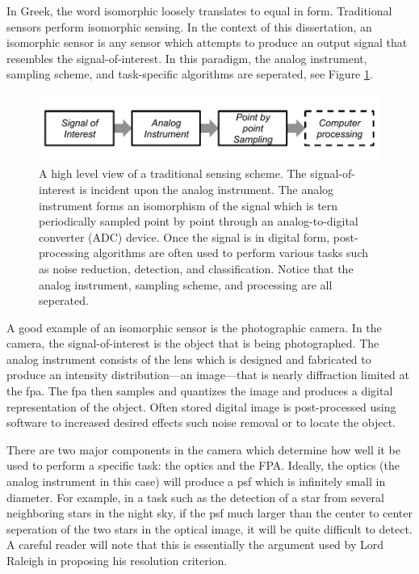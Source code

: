 In Greek, the word isomorphic loosely translates to equal in form. Traditional sensors perform isomorphic sensing. In the context of this dissertation, an isomorphic sensor is any sensor which attempts to produce an output signal that resembles the signal-of-interest. In this paradigm, the analog instrument, sampling scheme, and task-specific algorithms are seperated, see Figure \ref{fig:isomorphicsesingflowchart}.


\begin{figure}
    \centering
    \includegraphics[scale=1]{isomorphicsensorflowchart}
    \caption{A high level view of a traditional sensing scheme. The signal-of-interest is incident upon the analog instrument. The analog instrument forms an isomorphism of the signal which is tern periodically sampled point by point through an analog-to-digital converter (ADC) device. Once the signal is in digital form, post-processing algorithms are often used to perform various tasks such as noise reduction, detection, and classification. Notice that the analog instrument, sampling scheme, and processing are all seperated. }
    \label{fig:isomorphicsesingflowchart}
\end{figure}

A good example of an isomorphic sensor is the photographic camera. In the camera, the signal-of-interest is the object that is being photographed. The analog instrument consists of the lens which is designed and fabricated to produce an intensity distribution---an image---that is nearly diffraction limited at the \gls{fpa}. The \gls{fpa} then samples and quantizes the image and produces a digital representation of the object. Often stored digital image is post-processed using software to increased desired effects such noise removal or to locate the object. 

There are two major components in the camera which determine how well it be used to perform a specific task: the optics and the FPA. Ideally, the optics (the analog instrument in this case) will produce a \gls{psf} which is infinitely small in diameter. For example, in a task such as the detection of a star from several neighboring stars in the night sky, if the  \gls{psf} much larger than the center to center seperation of the two stars in the optical image, it will be quite difficult to detect. A careful reader will note that this is essentially the argument used by Lord Raleigh in proposing his resolution criterion. 

